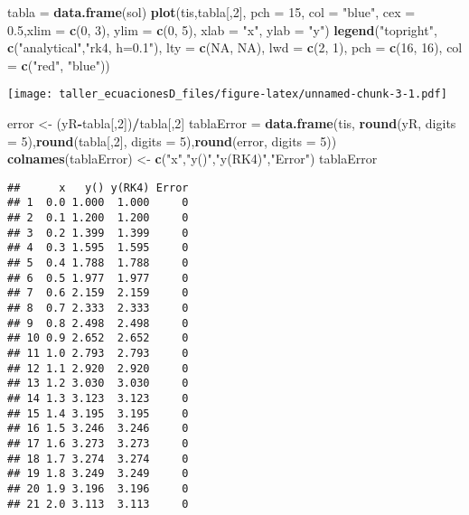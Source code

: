 \documentclass[]{article}
\newenvironment{Shaded}{\begin{snugshade}}{\end{snugshade}}
\newcommand{\KeywordTok}[1]{\textcolor[rgb]{0.13,0.29,0.53}{\textbf{#1}}}
\newcommand{\DataTypeTok}[1]{\textcolor[rgb]{0.13,0.29,0.53}{#1}}
\newcommand{\DecValTok}[1]{\textcolor[rgb]{0.00,0.00,0.81}{#1}}
\newcommand{\FloatTok}[1]{\textcolor[rgb]{0.00,0.00,0.81}{#1}}
\newcommand{\StringTok}[1]{\textcolor[rgb]{0.31,0.60,0.02}{#1}}
\newcommand{\OtherTok}[1]{\textcolor[rgb]{0.56,0.35,0.01}{#1}}
\newcommand{\OperatorTok}[1]{\textcolor[rgb]{0.81,0.36,0.00}{\textbf{#1}}}
\newcommand{\NormalTok}[1]{#1}
\begin{document}
\begin{Shaded}
\begin{Highlighting}[]
\NormalTok{tabla =}\StringTok{ }\KeywordTok{data.frame}\NormalTok{(sol)}
\KeywordTok{plot}\NormalTok{(tis,tabla[,}\DecValTok{2}\NormalTok{], }\DataTypeTok{pch =} \DecValTok{15}\NormalTok{, }\DataTypeTok{col =} \StringTok{"blue"}\NormalTok{, }\DataTypeTok{cex =} \FloatTok{0.5}\NormalTok{,}\DataTypeTok{xlim =} \KeywordTok{c}\NormalTok{(}\DecValTok{0}\NormalTok{, }\DecValTok{3}\NormalTok{), }\DataTypeTok{ylim =} \KeywordTok{c}\NormalTok{(}\DecValTok{0}\NormalTok{, }\DecValTok{5}\NormalTok{), }\DataTypeTok{xlab =} \StringTok{"x"}\NormalTok{, }\DataTypeTok{ylab =} \StringTok{"y"}\NormalTok{)}
\KeywordTok{legend}\NormalTok{(}\StringTok{"topright"}\NormalTok{,}
       \KeywordTok{c}\NormalTok{(}\StringTok{"analytical"}\NormalTok{,}\StringTok{"rk4, h=0.1"}\NormalTok{),}
       \DataTypeTok{lty =} \KeywordTok{c}\NormalTok{(}\OtherTok{NA}\NormalTok{, }\OtherTok{NA}\NormalTok{), }\DataTypeTok{lwd =} \KeywordTok{c}\NormalTok{(}\DecValTok{2}\NormalTok{, }\DecValTok{1}\NormalTok{),}
       \DataTypeTok{pch =} \KeywordTok{c}\NormalTok{(}\DecValTok{16}\NormalTok{, }\DecValTok{16}\NormalTok{),}
       \DataTypeTok{col =} \KeywordTok{c}\NormalTok{(}\StringTok{"red"}\NormalTok{, }\StringTok{"blue"}\NormalTok{))}
\end{Highlighting}
\end{Shaded}

\texttt{[image: taller\_ecuacionesD\_files/figure-latex/unnamed-chunk-3-1.pdf]}

\begin{Shaded}
\begin{Highlighting}[]
\NormalTok{error <-}\StringTok{ }\NormalTok{(yR}\OperatorTok{-}\NormalTok{tabla[,}\DecValTok{2}\NormalTok{])}\OperatorTok{/}\NormalTok{tabla[,}\DecValTok{2}\NormalTok{]}
\NormalTok{tablaError =}\StringTok{ }\KeywordTok{data.frame}\NormalTok{(tis, }\KeywordTok{round}\NormalTok{(yR, }\DataTypeTok{digits =} \DecValTok{5}\NormalTok{),}\KeywordTok{round}\NormalTok{(tabla[,}\DecValTok{2}\NormalTok{], }\DataTypeTok{digits =} \DecValTok{5}\NormalTok{),}\KeywordTok{round}\NormalTok{(error, }\DataTypeTok{digits =} \DecValTok{5}\NormalTok{))}
\KeywordTok{colnames}\NormalTok{(tablaError) <-}\StringTok{ }\KeywordTok{c}\NormalTok{(}\StringTok{"x"}\NormalTok{,}\StringTok{"y()"}\NormalTok{,}\StringTok{"y(RK4)"}\NormalTok{,}\StringTok{"Error"}\NormalTok{)}
\NormalTok{tablaError}
\end{Highlighting}
\end{Shaded}

\begin{verbatim}
##      x   y() y(RK4) Error
## 1  0.0 1.000  1.000     0
## 2  0.1 1.200  1.200     0
## 3  0.2 1.399  1.399     0
## 4  0.3 1.595  1.595     0
## 5  0.4 1.788  1.788     0
## 6  0.5 1.977  1.977     0
## 7  0.6 2.159  2.159     0
## 8  0.7 2.333  2.333     0
## 9  0.8 2.498  2.498     0
## 10 0.9 2.652  2.652     0
## 11 1.0 2.793  2.793     0
## 12 1.1 2.920  2.920     0
## 13 1.2 3.030  3.030     0
## 14 1.3 3.123  3.123     0
## 15 1.4 3.195  3.195     0
## 16 1.5 3.246  3.246     0
## 17 1.6 3.273  3.273     0
## 18 1.7 3.274  3.274     0
## 19 1.8 3.249  3.249     0
## 20 1.9 3.196  3.196     0
## 21 2.0 3.113  3.113     0
\end{verbatim}
\end{document}
